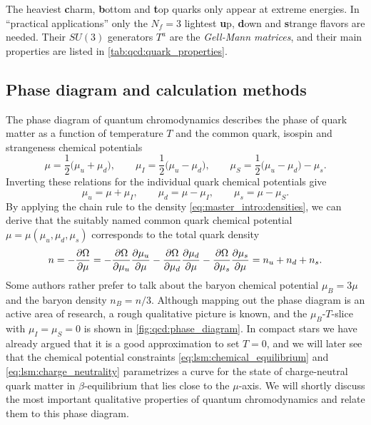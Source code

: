 The heaviest \textbf{c}harm, \textbf{b}ottom and \textbf{t}op quarks only appear at extreme energies.
In ``practical applications'' only the $N_f=3$ lightest \textbf{u}p, \textbf{d}own and \textbf{s}trange flavors are needed.
Their $SU(3)$ generators $T^a$ are the \emph{Gell-Mann matrices},
and their main properties are listed in \cref{tab:qcd:quark_properties}.

\subsection*{Phase diagram and calculation methods}

The phase diagram of quantum chromodynamics describes the phase of quark matter
as a function of temperature $T$ and the common quark, isospin and strangeness chemical potentials
\begin{equation}
	\mu   = \frac12 \big( \mu_u + \mu_d \big), \qquad
	\mu_I = \frac12 \big( \mu_u - \mu_d \big), \qquad
	\mu_S = \frac12 \big( \mu_u - \mu_d \big) - \mu_s.
\label{eq:master_intro:chemical_potentials_transformed}
\end{equation}
Inverting these relations for the individual quark chemical potentials give
\begin{equation}
	\mu_u = \mu + \mu_I, \qquad
	\mu_d = \mu - \mu_I, \qquad
	\mu_s = \mu - \mu_S .
\label{eq:master_intro:chemical_potentials_particles}
\end{equation}
By applying the chain rule to the density \eqref{eq:master_intro:densities},
we can derive that the suitably named common quark chemical potential $\mu=\mu(\mu_u,\mu_d,\mu_s)$ corresponds to the total quark density
\begin{equation}
	n = -\pdv{\Omega}{\mu} =
	-\pdv{\Omega}{\mu_u} \pdv{\mu_u}{\mu}
	-\pdv{\Omega}{\mu_d} \pdv{\mu_d}{\mu}
	-\pdv{\Omega}{\mu_s} \pdv{\mu_s}{\mu} =
	n_u + n_d + n_s.
\end{equation}
Some authors rather prefer to talk about the baryon chemical potential $\mu_B = 3 \mu$ and the baryon density $n_B = n / 3$.
Although mapping out the phase diagram is an active area of research, a rough qualitative picture is known, and the $\mu_B$-$T$-slice with $\mu_I = \mu_S = 0$ is shown in \cref{fig:qcd:phase_diagram}.
In compact stars we have already argued that it is a good approximation to set $T=0$,
and we will later see that the chemical potential constraints \eqref{eq:lsm:chemical_equilibrium} and \eqref{eq:lsm:charge_neutrality}
parametrizes a curve for the state of charge-neutral quark matter in $\beta$-equilibrium that lies close to the $\mu$-axis.
We will shortly discuss the most important qualitative properties of quantum chromodynamics and relate them to this phase diagram.

